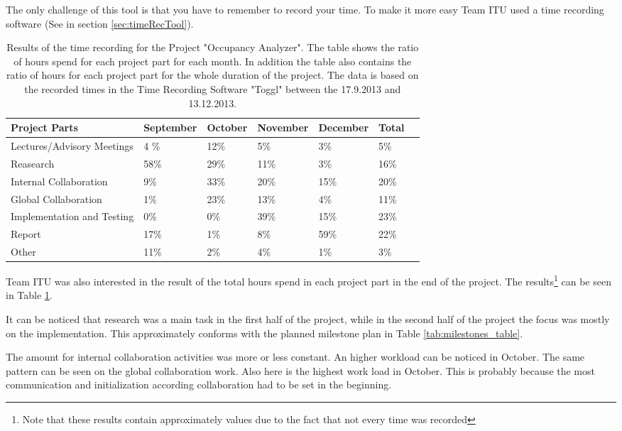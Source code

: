 The only challenge of this tool is that you have to remember to record your time. To make it more easy Team ITU used a time recording software (See in section \ref{sec:timeRecTool}).

\begin{table}[htb]
	\centering
	\begin{tabular}{ |  p{} |  p{2cm} |  p{2cm} |  p{2cm} |  p{2cm} |  p{2cm} |  p{2cm}|}
    		\hline
   		Project Parts & September & October & November & December & Total\\ \hline
    		Lectures/Advisory Meetings & 4 \% & 12\% & 5\% & 3\% & 5\% \\ \hline
    		Reasearch & 58\% & 29\% & 11\% & 3\% & 16\% \\ \hline
		Internal Collaboration & 9\% & 33\% & 20\% & 15\% & 20\%\\ \hline
    		Global Collaboration & 1\% & 23\% & 13\% & 4\% & 11\%\\ \hline
    		Implementation and Testing & 0\% & 0\% & 39\% & 15\% & 23\% \\ \hline
    		Report & 17\% & 1\%  & 8\% & 59\% & 22\% \\ \hline
 		Other & 11\% & 2\% & 4\% & 1\% & 3\%\\ \hline
	\end{tabular}
	\caption{Results of the time recording for the Project "Occupancy Analyzer". The table shows the ratio of hours spend for each project part for each month. In addition the table also contains the ratio of hours for each project part for the whole duration of the project. The data is based on the recorded times in the Time Recording Software "Toggl" between the 17.9.2013 and 13.12.2013.}
	\label{tab:timeRecResults}
\end{table}

Team ITU was also interested in the result of the total hours spend in each project part in the end of the project. The results\footnote{Note that these results contain approximately values due to the fact that not every time was recorded} can be seen in Table \ref{tab:timeRecResults}.

It can be noticed that research was a main task in the first half of the project, while in the second half of the project the focus was mostly on the implementation. This approximately conforms with the planned milestone plan in Table \ref{tab:milestones_table}.

The amount for internal collaboration activities was more or less constant. An higher workload can be noticed in October. The same pattern can be seen on the global collaboration work. Also here is the highest work load in October. This is probably because the most communication and initialization according collaboration had to be set in the beginning.

